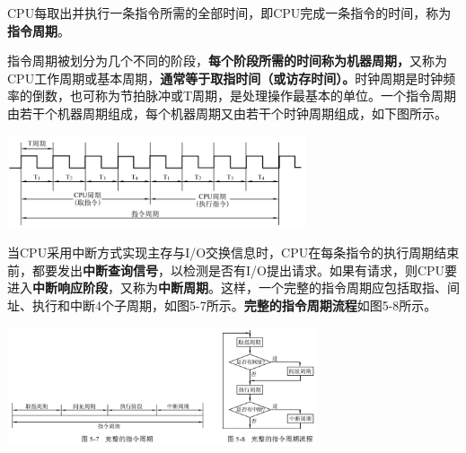 CPU每取出并执行一条指令所需的全部时间，即CPU完成一条指令的时间，称为\textbf{指令周期}。

指令周期被划分为几个不同的阶段，\textbf{每个阶段所需的时间称为机器周期，}又称为CPU工作周期或基本周期，{\textbf{通常等于取指时间（或访存时间）。}}时钟周期是时钟频率的倒数，也可称为节拍脉冲或T周期，是处理操作最基本的单位。一个指令周期由若干个机器周期组成，每个机器周期又由若干个时钟周期组成，如下图所示。

\includegraphics[width=3.46875in,height=1.07292in]{png-jpeg-pics/84CCBE908CB7911028A70F4E2C3D9F3F.png}

当CPU采用中断方式实现主存与I/O交换信息时，CPU在每条指令的执行周期结束前，都要发出\textbf{中断查询信号}，以检测是否有I/O提出请求。如果有请求，则CPU要进入\textbf{中断响应阶段}，又称为\textbf{中断周期}。这样，一个完整的指令周期应包括取指、间址、执行和中断4个子周期，如图5-7所示。{\textbf{完整的指令周期流程}}如图5-8所示。

\includegraphics[width=3.59375in,height=1.37500in]{png-jpeg-pics/8086B5405CC83F4089C19FEBE6E5537B.png}

